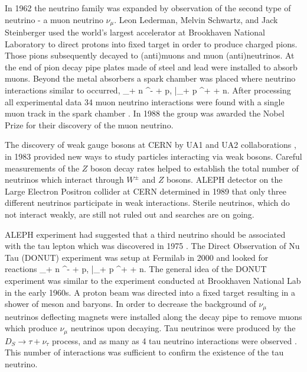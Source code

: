 In 1962 the neutrino family was expanded by observation of the second type of neutrino - 
a muon neutrino $\nu_\mu$.  Leon Lederman, Melvin Schwartz, and Jack Steinberger used 
the world's largest accelerator at Brookhaven National Laboratory to direct protons into 
fixed target in order to produce charged pions. Those pions subsequently decayed to 
(anti)muons and muon (anti)neutrinos. At the end of pion decay pipe plates made of steel 
and lead were installed to absorb muons. Beyond the metal absorbers a spark chamber was 
placed where neutrino interactions similar to  occurred,
\be
\nu_\mu + n \rightarrow \mu^- + p,\qquad
\bar{\nu}_\mu + p \rightarrow \mu^+ + n.
\ee
After processing all experimental data 34 muon neutrino interactions were found with 
a single muon track in the spark chamber \cite{danby}. In 1988 the group was awarded 
the Nobel Prize for their discovery of the muon neutrino.

The discovery of weak gauge bosons at CERN by UA1 and UA2 collaborations \cite{arnison}, 
\cite{arnison2} in 1983 provided new ways to study particles interacting via weak bosons. 
Careful measurements of the $Z$ boson decay rates helped to establish the total number 
of neutrinos which interact through $W^\pm$ and $Z$ bosons. ALEPH detector on the 
Large Electron Positron collider at CERN determined \cite{decamp} in 1989 that only 
three different neutrinos participate in weak interactions. Sterile neutrinos, which 
do not interact weakly, are still not ruled out and searches are on going.

ALEPH experiment had suggested that a third neutrino should be associated with the tau 
lepton which was discovered in 1975 \cite{perl}. The Direct Observation of Nu Tau (DONUT) 
experiment was setup at Fermilab in 2000 and looked for reactions
\be
\nu_\tau + n \rightarrow \tau^- + p,\qquad
\bar{\nu}_\tau + p \rightarrow \tau^+ + n.
\ee
The general idea of the DONUT experiment was similar to the experiment conducted at 
Brookhaven National Lab in the early 1960s. A proton beam was directed into a fixed 
target resulting in a shower of meson and baryons. In order to decrease the background 
of $\nu_\mu$ neutrinos deflecting magnets were installed along the decay pipe to remove 
muons which produce $\nu_\mu$ neutrinos upon decaying. Tau neutrinos were produced by 
the $D_S \rightarrow \tau + \nu_\tau$ process, and as many as 4 tau neutrino interactions 
were observed \cite{kodama}. This number of interactions was sufficient to confirm 
the existence of the tau neutrino.

